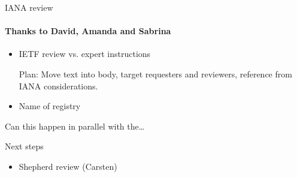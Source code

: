 \begin{frame}{IANA review}\Large
  \framesubtitle{Thanks to David, Amanda and Sabrina}
  \begin{itemize}
    \item IETF review vs. expert instructions

      \bigskip

      Plan: Move text into body, target requesters and reviewers, reference from IANA considerations.
      \bigskip
    \item Name of registry
  \end{itemize}

  \bigskip

  Can this happen in parallel with the…
\end{frame}

\begin{frame}{Next steps}\Large
  \begin{itemize}
    \item Shepherd review (Carsten)
  \end{itemize}
\end{frame}


